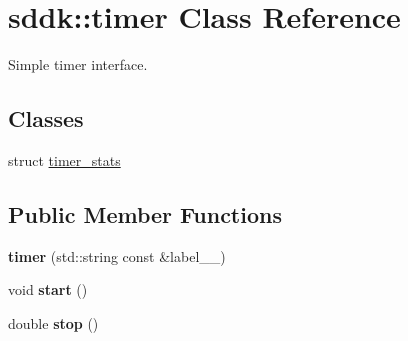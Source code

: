 \hypertarget{classsddk_1_1timer}{}\section{sddk\+:\+:timer Class Reference}
\label{classsddk_1_1timer}


Simple timer interface.  


\subsection*{Classes}
\begin{DoxyCompactItemize}
\item 
struct \hyperlink{structsddk_1_1timer_1_1timer__stats}{timer\+\_\+stats}
\end{DoxyCompactItemize}
\subsection*{Public Member Functions}
\begin{DoxyCompactItemize}
\item 
\hypertarget{classsddk_1_1timer_a85ca36ff06e7462c8328a1a2d7e8fc15}{}{\bfseries timer} (std\+::string const \&label\+\_\+\+\_\+)\label{classsddk_1_1timer_a85ca36ff06e7462c8328a1a2d7e8fc15}

\item 
\hypertarget{classsddk_1_1timer_ab045b14923aea5ca83e4e56267ee201a}{}void {\bfseries start} ()\label{classsddk_1_1timer_ab045b14923aea5ca83e4e56267ee201a}

\item 
\hypertarget{classsddk_1_1timer_a82102d82d2abf7f4d56fa04ecf0f6978}{}double {\bfseries stop} ()\label{classsddk_1_1timer_a82102d82d2abf7f4d56fa04ecf0f6978}

\end{DoxyCompactItemize}
